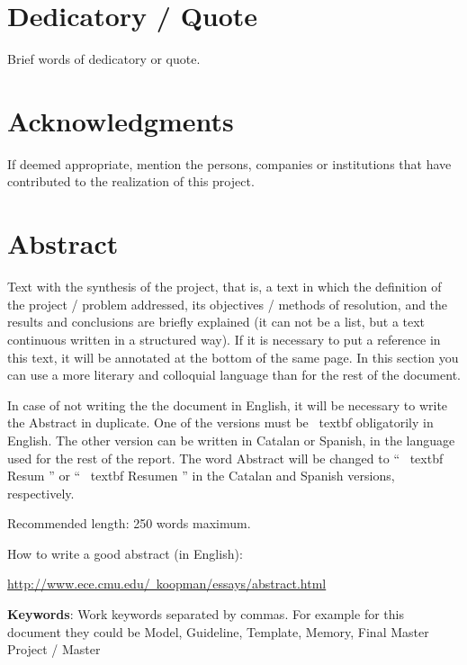 \chapter*{Dedicatory / Quote}

Brief words of dedicatory or quote.

\chapter*{Acknowledgments}

If deemed appropriate, mention the persons, companies or institutions that have contributed to the realization of this project.

\chapter*{Abstract}

\onehalfspacing

Text with the synthesis of the project, that is, a text in which the definition of the project / problem addressed, its objectives / methods of resolution, and the results and conclusions are briefly explained (it can not be a list, but a text continuous written in a structured way). If it is necessary to put a reference in this text, it will be annotated at the bottom of the same page. In this section you can use a more literary and colloquial language than for the rest of the document.

In case of not writing the the document in English, it will be necessary to write the Abstract  in duplicate. One of the versions must be \ textbf {obligatorily in English}. The other version can be written in Catalan or Spanish, in the language used for the rest of the report. The word Abstract will be changed to `` \ textbf {Resum} '' or `` \ textbf {Resumen} '' in the Catalan and Spanish versions, respectively.


Recommended length: 250 words maximum.

How to write a good abstract (in English):

\href{http://www.ece.cmu.edu/~koopman/essays/abstract.html}{http://www.ece.cmu.edu/~koopman/essays/abstract.html}

\vspace{1.5cm}

\textbf{Keywords}: Work keywords separated by commas. For example for this document they could be Model, Guideline, Template, Memory, Final Master Project / Master